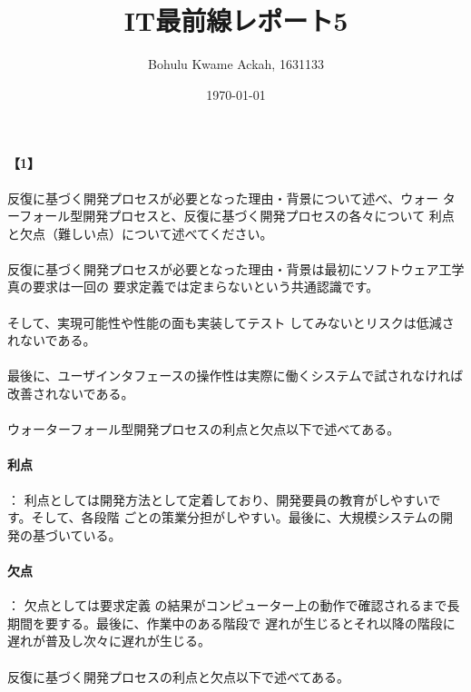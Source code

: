 \documentclass[20 pts]{article}
\title{IT最前線レポート5}
\author{Bohulu Kwame Ackah, 1631133}
\date{\today}
\begin{document}
\maketitle

\newpage
\paragraph{【1】}反復に基づく開発プロセスが必要となった理由・背景について述べ、ウォー
ターフォール型開発プロセスと、反復に基づく開発プロセスの各々について
利点と欠点（難しい点）について述べてください。 \\
\paragraph{}
反復に基づく開発プロセスが必要となった理由・背景は最初にソフトウェア工学真の要求は一回の
要求定義では定まらないという共通認識です。
\paragraph{}
そして、実現可能性や性能の面も実装してテスト
してみないとリスクは低減されないである。
\paragraph{}
最後に、ユーザインタフェースの操作性は実際に働くシステムで試されなければ改善されないである。

\paragraph{}
ウォーターフォール型開発プロセスの利点と欠点以下で述べてある。

\paragraph{利点}：
利点としては開発方法として定着しており、開発要員の教育がしやすいです。そして、各段階
ごとの策業分担がしやすい。最後に、大規模システムの開発の基づいている。
\paragraph{欠点}：
欠点としては要求定義
の結果がコンピューター上の動作で確認されるまで長期間を要する。最後に、作業中のある階段で
遅れが生じるとそれ以降の階段に遅れが普及し次々に遅れが生じる。

\paragraph{}
反復に基づく開発プロセスの利点と欠点以下で述べてある。
\end{document}
